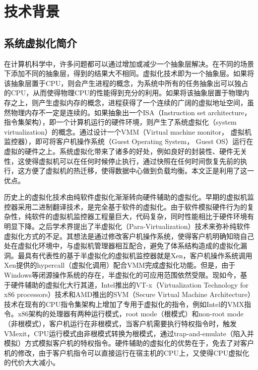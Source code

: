 
\chapter{技术背景}
\label{chap:RL}

\section{系统虚拟化简介}
在计算机科学中，许多问题都可以通过增加或减少一个抽象层解决。在不同的场景下添加不同的抽象层，得到的结果大不相同。虚拟化技术即为一个抽象层。如果将该抽象层置于CPU，则会产生进程的概念，为系统中所有的任务抽象出可以独占的CPU，从而使得物理CPU的性能得到充分的利用。如果将该抽象层置于物理内存之上，则产生虚拟内存的概念，进程获得了一个连续的广阔的虚拟地址空间，虽然物理内存不一定是连续的。如果抽象出一个ISA（Instruction set architecture，指令集架构），即一个计算机运行的硬件环境，则产生了系统虚拟化（system virtualization）的概念。通过设计一个VMM（Virtual machine monitor， 虚拟机监控器），即可将客户机操作系统（Guest Operating System， Guest OS）运行在虚拟的硬件之上。系统虚拟化带来了诸多的好处，例如良好的封装性、硬件无关性\cite{sysv}，这使得虚拟机可以在任何时候停止执行，通过快照在任何时间恢复先前的执行，这方便了虚拟机的热迁移，使得数据中心做到负载均衡。本文正是利用了这一优点。

历史上的虚拟化技术由纯软件虚拟化渐渐转向硬件辅助的虚拟化。早期的虚拟机监控器采用二进制翻译技术，是完全基于软件的虚拟化。由于软件模拟硬件行为的复杂性，纯软件的虚拟机监控器工程量巨大，代码复杂，同时性能相比于硬件环境有明显下降。之后学术界提出了半虚拟化（Para-Virtualization）技术来弥补纯软件虚拟化方式的不足。其想法是通过修改客户机操作系统，使得客户机明确知晓自己处在虚拟化环境中，与虚拟机管理器相互配合，避免了体系结构造成的虚拟化漏洞。最具有代表性的基于半虚拟化的虚拟机监控器就是Xen\cite{artofxen}，客户机操作系统调用Xen提供的hypercall（虚拟化调用）配合VMM完成虚拟化功能。但是，由于Windows等闭源操作系统的存在，半虚拟化的可应用范围依然受限。现如今，基于硬件辅助的虚拟化大行其道，Intel推出的VT-x（Virtualization Technology for x86 processors）技术\cite{intelv}和AMD推出的SVM（Secure Virtual Machine Architecture）技术\cite{amdv}在现有的CPU指令集架构上增加了专用于虚拟化的指令，例如Intel的VMX指令\cite{intelSDM}。x86架构的处理器有两种运行模式，root mode（根模式）和non-root mode（非根模式），客户机运行在非根模式，当客户机需要执行特权指令时，触发VMexit，CPU运行模式由非根模式转换为根模式，通过trap-and-emulate（陷入并模拟）方式模拟客户机的特权指令。硬件辅助的虚拟化的优势在于，免去了对客户机的修改，由于客户机指令可以直接运行在宿主机的CPU上，又使得CPU虚拟化的代价大大减小。

